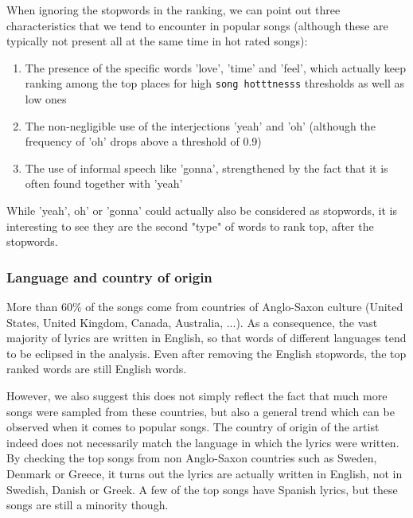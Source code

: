 \documentclass[11pt]{article}
\renewcommand\_{\textunderscore\allowbreak}
\begin{document}
When ignoring the stopwords in the ranking, we can point out three characteristics that we tend to encounter in popular songs (although these are typically not present all at the same time in hot rated songs):
\begin{enumerate}
\itemsep 0mm
\item The presence of the specific words 'love', 'time' and 'feel', which actually keep ranking among the top places for high \texttt{song hotttnesss} thresholds as well as low ones
\item The non-negligible use of the interjections 'yeah' and 'oh' (although the frequency of 'oh' drops above a threshold of 0.9)
\item The use of informal speech like 'gonna', strengthened by the fact that it is often found together with 'yeah'
\end{enumerate}
While 'yeah', oh' or 'gonna' could actually also be considered as stopwords, it is interesting to see they are the second "type" of words to rank top, after the stopwords.

\subsubsection{Language and country of origin}
More than 60\% of the songs come from countries of Anglo-Saxon culture (United States, United Kingdom, Canada, Australia, ...). As a consequence, the vast majority of lyrics are written in English, so that words of different languages tend to be eclipsed in the analysis.
Even after removing the English stopwords, the top ranked words are still English words.

However, we also suggest this does not simply reflect the fact that much more songs were sampled from these countries, but also a general trend which can be observed when it comes to popular songs.
The country of origin of the artist indeed does not necessarily match the language in which the lyrics were written.
By checking the top songs from non Anglo-Saxon countries such as Sweden, Denmark or Greece, it turns out the lyrics are actually written in English, not in Swedish, Danish or Greek.
A few of the top songs have Spanish lyrics, but these songs are still a minority though.



\end{document}
